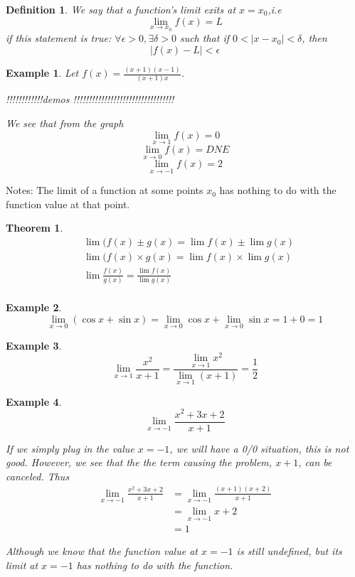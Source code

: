 \documentclass{article}
\newtheorem{definition}{Definition}
\newtheorem{ex}{Example}
\newtheorem{thm}{Theorem}
\begin{document}
\begin{definition}
	 We say that a function's limit exits at $x= x_0$,i.e 
	 \[ \lim_{x\to x_0} f(x) = L \]
	 if this statement is true: $\forall \epsilon>0, \exists \delta>0$ such that if $0<|x-x_0|<\delta$, then
	\[ |f(x)-L| < \epsilon \]
\end{definition}

\begin{ex}
	Let $f(x) = \frac{(x+1)(x-1)}{(x+1)x} $.
	\begin{center}
	 !!!!!!!!!!!!demos !!!!!!!!!!!!!!!!!!!!!!!!!!!!!!!!!
	\end{center}
We see that from the graph 
\[ \lim_{x\to1} f(x) = 0 \]
\[ \lim_{x\to0} f(x) = DNE\]
\[ \lim_{x\to-1} f(x) = 2 \]

\end{ex}

Notes: The limit of a function at some points $x_0$ has nothing to do with the function value at that point.

\begin{thm}
	\begin{align*}
	&\lim (f(x) \pm g(x) = \lim f(x) \pm \lim g(x)\\
	&\lim (f(x) \times g(x) = \lim f(x) \times \lim g(x)\\
	&\lim \frac{f(x)}{g(x)} =\frac{ \lim f(x)}{\lim g(x)}\\
	\end{align*}
\end{thm}

\begin{ex}
	\[\lim_{x\to 0}(\cos x+ \sin x) = \lim_{x\to 0}\cos x + \lim_{x\to 0}\sin x = 1+ 0 =1 \]
\end{ex}

\begin{ex}
	\[ \lim_{x\to 1} \frac{x^2}{x+1} = \frac{\lim_{x\to1} x^2}{\lim_{x\to 1}(x+1)} = \frac{1}{2} \]
\end{ex}
 
\begin{ex}
	\[\lim_{x\to-1}\frac{x^2 + 3x + 2}{x+1}\]
	
	If we simply plug in the value $x=-1$, we will have a 0/0 situation, this is not good. However, we see that the the term causing the problem, $x+1$, can be canceled. Thus
	\begin{align*}
		\lim_{x\to-1} \frac{x^2 +3x +2 }{x+1} 
		&= \lim_{x\to-1} \frac{(x+1)(x+2)}{x+1}\\
		&= \lim_{x\to-1} x+2\\
		&= 1
	\end{align*}
	
	Although we know that the function value at $x=-1$ is still undefined, but its limit at $x=-1$ has nothing to do with the function.   
\end{ex}
\end{document}
